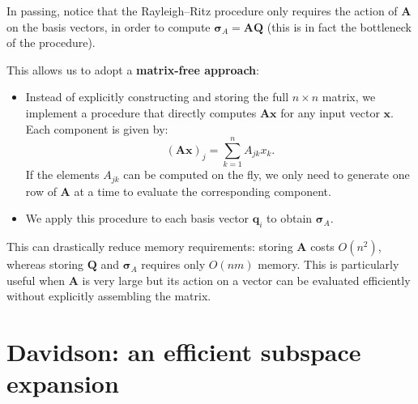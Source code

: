 \documentclass[10pt,aspectratio=169]{beamer}
\begin{document}
\begin{frame}
	In passing, notice that the Rayleigh--Ritz procedure only requires the action of $\mathbf A$ on the basis vectors, in order to compute $\boldsymbol{\sigma}_A=\mathbf A\mathbf Q$ (this is in fact the bottleneck of the procedure).
	
	\pause
	\medskip
	This allows us to adopt a \textbf{matrix-free approach}:
	\begin{itemize}
		\item Instead of explicitly constructing and storing the full $n\times n$ matrix, we implement a procedure that directly computes $\mathbf A\mathbf x$ for any input vector $\mathbf x$. Each component is given by:
		\begin{equation*}
			(\mathbf A\mathbf x)_j=\sum_{k=1}^n A_{jk}x_k.
		\end{equation*}
		If the elements $A_{jk}$ can be computed on the fly, we only need to generate one row of $\mathbf A$ at a time to evaluate the corresponding component.
		\item We apply this procedure to each basis vector $\mathbf q_i$ to obtain $\boldsymbol{\sigma}_A$.
	\end{itemize}
	
	\medskip
	This can drastically reduce memory requirements: storing $\mathbf A$ costs $O(n^2)$, whereas storing $\mathbf Q$ and $\boldsymbol{\sigma}_A$ requires only $O(nm)$ memory. This is particularly useful when $\mathbf A$ is very large but its action on a vector can be evaluated efficiently without explicitly assembling the matrix.
\end{frame}

\section{Davidson: an efficient subspace expansion}
\end{document}
